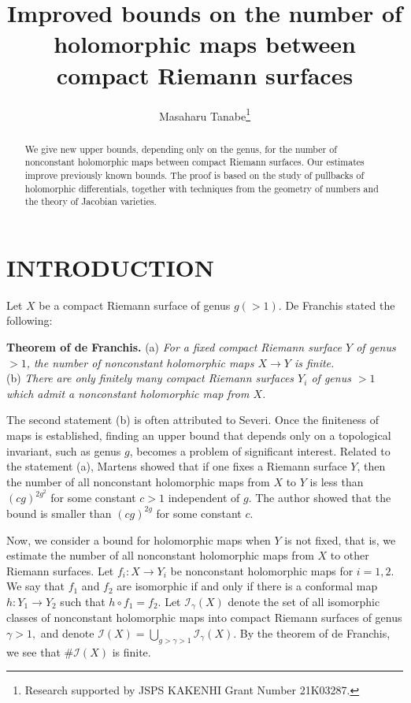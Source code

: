 \documentclass[11pt]{article}
\title{Improved bounds on the number of holomorphic maps
between compact Riemann surfaces}
\author{
Masaharu Tanabe\thanks{Research supported by JSPS KAKENHI Grant Number 21K03287.}
}
\date{}
\numberwithin{equation}{section}
\theoremstyle{plain}
\renewcommand{\thefootnote}{}
\begin{document}
\maketitle

\begingroup
\renewcommand{\thefootnote}{}
\endgroup


\begin{abstract}
 \small{We give new upper bounds, depending only on the genus, for the number of nonconstant holomorphic maps between compact Riemann surfaces.
Our estimates improve previously known bounds.
The proof is based on the study of pullbacks of holomorphic differentials, together with techniques from the geometry of numbers and the theory of Jacobian varieties.}
\end{abstract}

\section{INTRODUCTION} 

 Let $X$ be a compact Riemann surface of genus $g(>1)$. De Franchis \cite{F} stated the following: 

\vspace{0.2cm}
 \textbf{Theorem of de Franchis.} (a) \textit{For a fixed compact Riemann surface $Y$ of genus $>1$, the number of nonconstant holomorphic maps $X\rightarrow Y$ is finite.} \\
(b) \textit{There are only finitely many compact Riemann surfaces $Y_{i}$ of genus $> 1$ which admit a nonconstant holomorphic map from $X$.} 

\vspace{0.2cm}
 The second statement (b) is often attributed to Severi. 
 Once the finiteness of maps is established, finding an upper bound that depends only on a topological invariant, such as genus \(g\), becomes a problem of significant interest.
 Related to the statement (a), Martens \cite{Mr} showed that if one fixes a Riemann surface $Y$, then the number of all nonconstant holomorphic maps from $X$ to $Y$ is less than $(cg)^{2g^{2}}$ for some constant $c>1$ independent of $g$. The author \cite{T1} showed that the bound is smaller than $(cg)^{2g}$ for some constant $c$. 

 Now, we consider a bound for holomorphic maps when $Y$ is not fixed, that is, we estimate the number of all nonconstant holomorphic maps from $X$ to other Riemann surfaces. Let $f_{i}:X\rightarrow Y_{i}$ be nonconstant holomorphic maps for $i=1,2$. 
We say that $f_{1}$ and $f_{2}$ are isomorphic if and only if there is a conformal map $h:Y_{1}\rightarrow Y_{2}$ such that $h\circ f_{1}=f_{2}$. Let $\mathcal{I}_{\gamma}(X)$ denote the set of all isomorphic classes of nonconstant holomorphic maps into compact Riemann surfaces of genus $\gamma>1,$ and denote $\mathcal{I}(X)=\bigcup_{g>\gamma>1}\mathcal{I}_{\gamma}(X)$. By the theorem of de Franchis, we see that $\#\mathcal{I}(X)$ is finite. 
\end{document}
